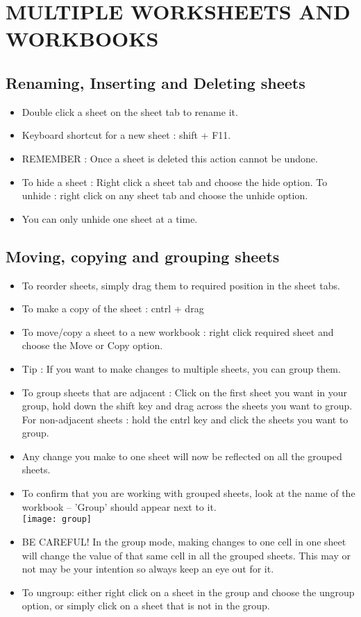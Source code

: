 \documentclass[11pt, oneside]{article}   	%
\begin{document}
\section{MULTIPLE WORKSHEETS AND WORKBOOKS}
\subsection{ Renaming, Inserting and Deleting sheets}
\begin{itemize}
\item Double click a sheet on the sheet tab to rename it.
\item Keyboard shortcut for a new sheet : shift + F11.
\item REMEMBER : Once a sheet is deleted this action cannot be undone.
\item To hide a sheet : Right click a sheet tab and choose the hide option. To unhide : right click on any sheet tab and choose the unhide option. 
\item You can only unhide one sheet at a time.
\end{itemize}
\subsection{ Moving, copying and grouping sheets}
\begin{itemize}
\item To reorder sheets, simply drag them to required position in the sheet tabs.
\item To make a copy of the sheet : cntrl + drag
\item To move/copy a sheet to a new workbook : right click required sheet and choose the Move or Copy option.
\item Tip : If you want to make changes to multiple sheets, you can group them. 
\item To group sheets that are adjacent : Click on the first sheet you want in your group, hold down the shift key and drag across the sheets you want to group. For non-adjacent sheets : hold the cntrl key and click the sheets you want to group.
\item Any change you make to one sheet will now be reflected on all the grouped sheets.
\item To confirm that you are working with grouped sheets, look at the name of the workbook -- 'Group' should appear next to it.
\bigskip \\
\texttt{[image: group]}
\bigskip \\
\item BE CAREFUL! In the group mode, making changes to one cell in one sheet will change the value of that same cell in all the grouped sheets. This may or not may be your intention so always keep an eye out for it.
\item To ungroup: either right click on a sheet in the group and choose the ungroup option, or simply click on a sheet that is not in the group.
\end{itemize}
\end{document}
